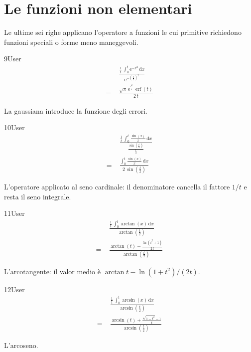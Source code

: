 \section{Le funzioni non elementari}

Le ultime sei righe applicano l'operatore a funzioni le cui primitive richiedono funzioni speciali o forme meno maneggevoli.

\begin{espr}{9}{User}{\verificata}
\begin{align*}
& \frac{\frac{1}{t}\, \int_{0}^{t} \mathrm{e}^{-x^{2}} \,\mathrm{d}x}{\mathrm{e}^{-\left(\frac{t}{2}\right)^{2}}} \\
=\;& \frac{\sqrt{\pi}\, \mathrm{e}^{\frac{t^{2}}{4}}\, \operatorname{erf}\!\left(t\right)}{2\, t}
\end{align*}
\end{espr}
La gaussiana introduce la funzione degli errori.

\begin{espr}{10}{User}{\verificata}
\begin{align*}
& \frac{\frac{1}{t}\, \int_{0}^{t} \frac{\sin\!\left(x\right)}{x} \,\mathrm{d}x}{\frac{\sin\!\left(\frac{t}{2}\right)}{\frac{t}{2}}} \\
=\;& \frac{\int_{0}^{t} \frac{\sin\!\left(x\right)}{x} \,\mathrm{d}x}{2\, \sin\!\left(\frac{t}{2}\right)}
\end{align*}
\end{espr}
L'operatore applicato al seno cardinale: il denominatore cancella il fattore $1/t$ e resta il seno integrale.

\begin{espr}{11}{User}{\verificata}
\begin{align*}
& \frac{\frac{1}{t}\, \int_{0}^{t} \arctan\!\left(x\right) \,\mathrm{d}x}{\arctan\!\left(\frac{t}{2}\right)} \\
=\;& \frac{\arctan\!\left(t\right) - \frac{\ln\!\left(t^{2} + 1\right)}{2\, t}}{\arctan\!\left(\frac{t}{2}\right)}
\end{align*}
\end{espr}
L'arcotangente: il valor medio è $\arctan t-\ln(1+t^2)/(2t)$.

\begin{espr}{12}{User}{\verificata}
\begin{align*}
& \frac{\frac{1}{t}\, \int_{0}^{t} \arcsin\!\left(x\right) \,\mathrm{d}x}{\arcsin\!\left(\frac{t}{2}\right)} \\
=\;& \frac{\arcsin\!\left(t\right) + \frac{\sqrt{1 - t^{2}} - 1}{t}}{\arcsin\!\left(\frac{t}{2}\right)}
\end{align*}
\end{espr}
L'arcoseno.


